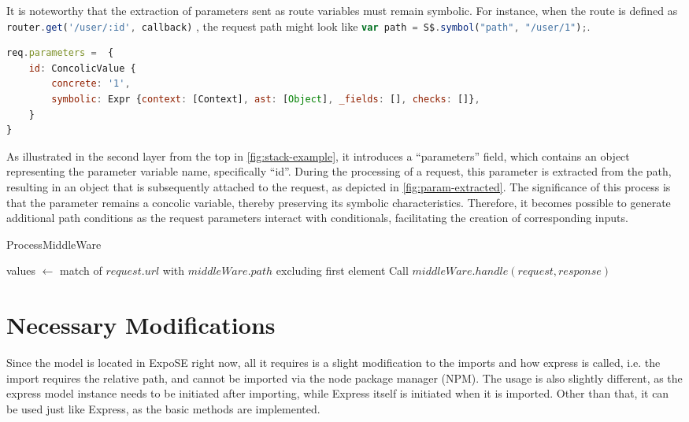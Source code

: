 It is noteworthy that the extraction of parameters sent as route variables must remain symbolic. For instance, when the route is defined as \lstinline[language=JavaScript]+router.get('/user/:id', callback)+ 
, the request path might look like \lstinline[language=JavaScript]{var path = S$.symbol("path", "/user/1");}.

\begin{lstlisting}[language=JavaScript, gobble=4,caption={Parameters extracted from the request path.},label={fig:param-extracted}, float]
req.parameters =  {
    id: ConcolicValue {
        concrete: '1',
        symbolic: Expr {context: [Context], ast: [Object], _fields: [], checks: []},
    }
}
\end{lstlisting}
As illustrated in the second layer from the top in \autoref{fig:stack-example}, it  introduces a “parameters” field, which contains an object representing the parameter variable name, specifically “id”. During the processing of a request, this parameter is extracted from the path, resulting in an object that is subsequently attached to the request, as depicted in \autoref{fig:param-extracted}.
The significance of this process is that the parameter remains a concolic variable, thereby preserving its symbolic characteristics. Therefore, it becomes possible to generate additional path conditions as the request parameters interact with conditionals, facilitating the creation of corresponding inputs.

\begin{algorithm}[t]
\caption{ProcessMiddleWare}
values $\gets$ match of $request.url$ with $middleWare.path$ excluding first element\;
Call $middleWare.handle(request, response)$\;
\end{algorithm}


\section{Necessary Modifications} 
\label{sec:nec-mods}

Since the model is located in ExpoSE right now, all it requires is a slight modification to the imports and how express is called, i.e. the import requires the relative path, and cannot be imported via the node package manager (NPM). 
The usage is also slightly different, as the express model instance needs to be initiated after importing, while Express itself is initiated when it is imported. 
Other than that, it can be used just like Express, as the basic methods are implemented.


